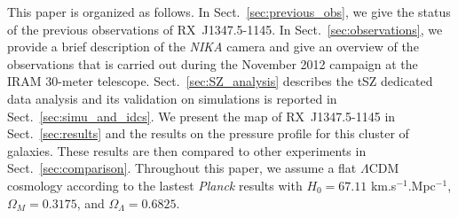 This paper is organized as follows. In Sect.~\ref{sec:previous_obs}, we give the status of the previous observations of \mbox{RX~J1347.5-1145}. In Sect.~\ref{sec:observations}, we provide a brief description of the {\it NIKA} camera and give an overview of the observations that is carried out during the November 2012 campaign at the IRAM 30-meter telescope. Sect.~\ref{sec:SZ_analysis} describes the tSZ dedicated data analysis and its validation on simulations is reported in Sect.~\ref{sec:simu_and_idcs}. We present the map of \mbox{RX~J1347.5-1145} in Sect.~\ref{sec:results} and the results on the pressure profile for this cluster of galaxies. These results are then compared to other experiments in Sect.~\ref{sec:comparison}. Throughout this paper, we assume a flat $\Lambda$CDM cosmology according to the lastest {\it Planck} results \citep{PLANCK_param_cosmo} with $H_0 = 67.11$ km.s$^{-1}$.Mpc$^{-1}$, $\Omega_M = 0.3175$, and $\Omega_{\Lambda} = 0.6825$.
